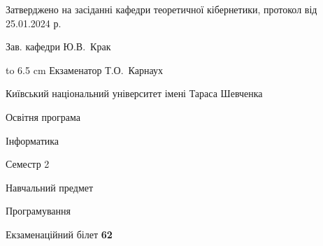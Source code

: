 \documentclass[12pt, ukrainian]{article}
\begin{document}
{\smallskip\smallskip \begin {scriptsize} Затверджено на засіданні кафедри теоретичної кібернетики, протокол   від   25.01.2024 р.\par\smallskip\smallskip\smallskip\smallskip
{\parbox {6.5 cm} {Зав. кафедри \dotfill Ю.В.~Крак}}\hspace {0.7cm} {\hbox to 6.5 cm { Екзаменатор \dotfill Т.О.~Карнаух}} \end{scriptsize}}
\newpage
{{\begin {scriptsize}\par
{ \center  Київський національний університет імені Тараса Шевченка \par}
{\parbox {5 cm}{Освітня програма \hfill}{\parbox {7 cm}{Інформатика\hfill}}\parbox {6 cm}{\hfill Семестр 2}}\par
{\parbox {5 cm} {Навчальний предмет \hfill}\parbox {7 cm}{Програмування \hfill}\parbox {6cm}{\hfill}\par}\vspace{-15pt} \end{scriptsize}}{\center Екзаменаційний білет \No \textbf { 62 }\par}}
\end{document}
